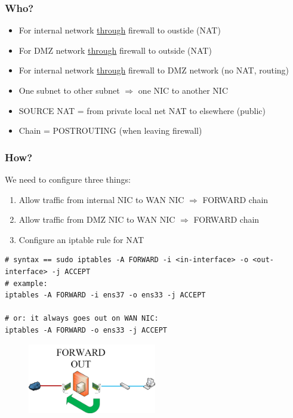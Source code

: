 \documentclass{article}
\begin{document}
\subsubsection{Who?}

\begin{itemize}
    \item For internal network \underline{through} firewall to oustide (NAT)
    \item For DMZ network \underline{through} firewall to outside (NAT)
    \item For internal network \underline{through} firewall to DMZ network (no NAT, routing)
    \item One subnet to other subnet $\Rightarrow$ one NIC to another NIC
    \item SOURCE NAT = from private local net NAT to elsewhere (public)
    \item Chain = POSTROUTING (when leaving firewall)
\end{itemize}

\subsubsection{How?}

We need to configure three things:

\begin{enumerate}
    \item Allow traffic from internal NIC to WAN NIC $\Rightarrow$ FORWARD chain
    \item Allow traffic from DMZ NIC to WAN NIC $\Rightarrow$ FORWARD chain
    \item Configure an iptable rule for NAT
\end{enumerate}

\begin{verbatim}
# syntax == sudo iptables -A FORWARD -i <in-interface> -o <out-interface> -j ACCEPT
# example: 
iptables -A FORWARD -i ens37 -o ens33 -j ACCEPT

# or: it always goes out on WAN NIC:
iptables -A FORWARD -o ens33 -j ACCEPT
\end{verbatim}

\begin{figure}[H]
    \centering
    \includegraphics[width=0.5\textwidth]{forward-out-chain.jpg}
\end{figure}
\end{document}
